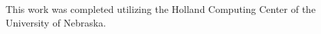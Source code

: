 \documentclass[conference]{IEEEtran}
\begin{document}
This work was completed utilizing the Holland Computing Center of the University of Nebraska.







%
%
%





\end{document}
